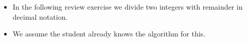 \begin{frame}
\begin{itemize}
\item In the following review exercise we divide two integers with remainder in decimal notation.
\item<2-> We assume the student already knows the algorithm for this.
\end{itemize}
\end{frame}
